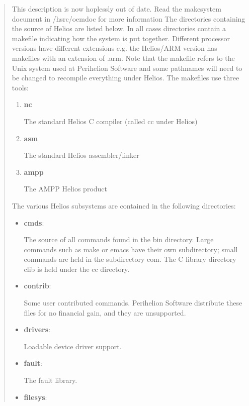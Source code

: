 \begin {quote}
This description is now hoplessly out of date.
Read the makesystem document in /hsrc/oemdoc for more information
The directories containing the source of Helios are listed below.
In all cases directories
contain a makefile indicating how the system is put together. Different
processor versions have different extensions e.g. the Helios/ARM version has
makefiles with an extension of .arm. Note
that the makefile refers to the Unix system used at Perihelion Software
and some pathnames will need to be changed to recompile everything under
Helios. The makefiles use three tools:

\begin{enumerate}
\item {\bf nc} 

The standard Helios C compiler (called cc under Helios)

\item {\bf asm} 

The standard Helios assembler/linker

\item {\bf ampp} 

The AMPP Helios product
\end{enumerate}

The various Helios subsystems are contained in the following directories:

\begin{itemize}

\item {\bf cmds}: 

The source of all commands found in the bin directory. Large
commands such as make or emacs have their own subdirectory;
small commands are held in the subdirectory com. The C library directory
clib is held under the cc directory.

\item {\bf contrib}: 

Some user contributed commands. Perihelion Software distribute
these files for no financial gain, and they are unsupported.

\item {\bf drivers}: 

Loadable device driver support.

\item {\bf fault}: 

The fault library.

\item {\bf filesys}:


\end{itemize}
\end{quote}
